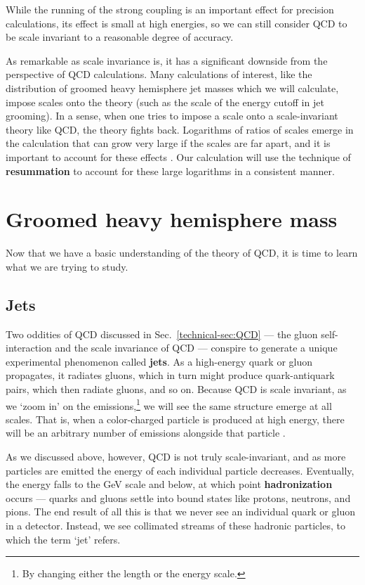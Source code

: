 \documentclass[../thesis.tex]{subfiles}
\begin{document}
	While the running of the strong coupling is an important effect for precision calculations, its effect is small at high energies, so we can still consider QCD to be scale invariant to a reasonable degree of accuracy.

	As remarkable as scale invariance is, it has a significant downside from the perspective of QCD calculations. Many calculations of interest, like the distribution of groomed heavy hemisphere jet masses which we will calculate, impose scales onto the theory (such as the scale of the energy cutoff in jet grooming). In a sense, when one tries to impose a scale onto a scale-invariant theory like QCD, the theory fights back. Logarithms of ratios of scales emerge in the calculation that can grow very large if the scales are far apart, and it is important to account for these effects \cite{larkoski_elementary_2019-1,becher_introduction_2015-1}. Our calculation will use the technique of \textbf{resummation} to account for these large logarithms in a consistent manner.

\section{Groomed heavy hemisphere mass}
	Now that we have a basic understanding of the theory of QCD, it is time to learn what we are trying to study.

\subsection{Jets}\label{technical-sec:jets}
	Two oddities of QCD discussed in Sec.~\ref{technical-sec:QCD} --- the gluon self-interaction and the scale invariance of QCD --- conspire to generate a unique experimental phenomenon called \textbf{jets}. As a high-energy quark or gluon propagates, it radiates gluons, which in turn might produce quark-antiquark pairs, which then radiate gluons, and so on. Because QCD is scale invariant, as we `zoom in' on the emissions,\footnote{By changing either the length or the energy scale.} we will see the same structure emerge at all scales. That is, when a color-charged particle is produced at high energy, there will be an arbitrary number of emissions alongside that particle \cite{larkoski_elementary_2019-1}. 

	As we discussed above, however, QCD is not truly scale-invariant, and as more particles are emitted the energy of each individual particle decreases. Eventually, the energy falls to the \si{\giga\electronvolt} scale and below, at which point \textbf{hadronization} occurs --- quarks and gluons settle into bound states like protons, neutrons, and pions. The end result of all this is that we never see an individual quark or gluon in a detector. Instead, we see collimated streams of these hadronic particles, to which the term `jet' refers.
\end{document}
